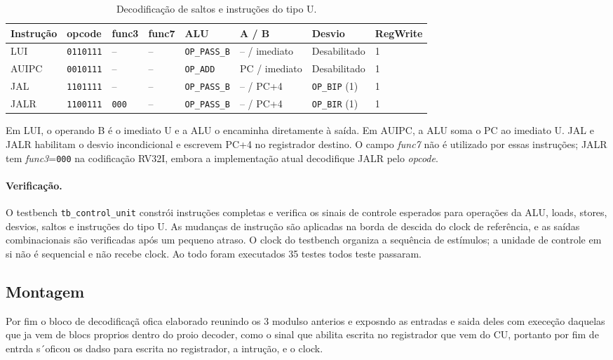 \begin{table}[!htb]
\centering
\small
\caption{Decodificação de saltos e instruções do tipo U.}
\label{tab:control-unit-jump-upper-decode}
\begin{tabular}{llllllll}
\toprule
\textbf{Instrução} & \textbf{opcode} & \textbf{func3} & \textbf{func7} & \textbf{ALU} & \textbf{A / B} & \textbf{Desvio} & \textbf{RegWrite} \\
\midrule
LUI   & \texttt{0110111} & -- & -- & \texttt{OP\_PASS\_B} & -- / imediato & Desabilitado & 1 \\
AUIPC & \texttt{0010111} & -- & -- & \texttt{OP\_ADD}    & PC / imediato & Desabilitado & 1 \\
JAL   & \texttt{1101111} & -- & -- & \texttt{OP\_PASS\_B} & -- / PC+4 & \texttt{OP\_BIP} (1) & 1 \\
JALR  & \texttt{1100111} & \texttt{000} & -- & \texttt{OP\_PASS\_B} & -- / PC+4 & \texttt{OP\_BIR} (1) & 1 \\
\bottomrule
\end{tabular}
\end{table}

Em LUI, o operando B é o imediato U e a ALU o encaminha diretamente à saída. Em AUIPC, a ALU soma o PC ao imediato U. JAL e JALR habilitam o desvio incondicional e escrevem PC+4 no registrador destino. O campo \textit{func7} não é utilizado por essas instruções; JALR tem \textit{func3}=\texttt{000} na codificação RV32I, embora a implementação atual decodifique JALR pelo \textit{opcode}.

\paragraph{Verificação.}
O testbench \texttt{tb\_control\_unit} constrói instruções completas e verifica os sinais de controle esperados para operações da ALU, loads, stores, desvios, saltos e instruções do tipo U. As mudanças de instrução são aplicadas na borda de descida do clock de referência, e as saídas combinacionais são verificadas após um pequeno atraso. O clock do testbench organiza a sequência de estímulos; a unidade de controle em si não é sequencial e não recebe clock. Ao todo foram executados 
35 testes todos teste passaram.


\subsection{Montagem}
\label{sub:montagem}

Por fim o bloco de decodificaçã ofica elaborado reunindo os 3 modulso anterios e exposndo as entradas e saida deles com execeção daquelas que ja vem de blocs proprios dentro do proio decoder, como o sinal que abilita escrita no registrador  que vem do CU, portanto por fim de entrda s´oficou os dadso para escrita no registrador, a intrução, e o clock.


